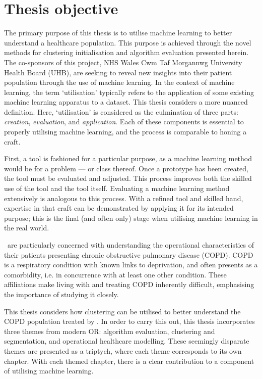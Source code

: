 \section{Thesis objective}\label{sec:objective}

The primary purpose of this thesis is to utilise machine learning to better
understand a healthcare population. This purpose is achieved through the novel
methods for clustering initialisation and algorithm evaluation presented herein.
The co-sponsors of this project, NHS Wales Cwm Taf Morgannwg University
Health Board (UHB), are seeking to reveal new insights into their patient
population through the use of machine learning. In the context of machine
learning, the term `utilisation' typically refers to the application of some
existing machine learning apparatus to a dataset. This thesis considers a more
nuanced definition. Here, `utilisation' is considered as the culmination of
three parts: \emph{creation}, \emph{evaluation}, and \emph{application}. Each of
these components is essential to properly utilising machine learning, and the
process is comparable to honing a craft.

First, a tool is fashioned for a particular purpose, as a machine learning
method would be for a problem --- or class thereof. Once a prototype has been
created, the tool must be evaluated and adjusted. This process improves both the
skilled use of the tool and the tool itself. Evaluating a machine
learning method extensively is analogous to this process. With a refined tool
and skilled hand, expertise in that craft can be demonstrated by applying it for
its intended purpose; this is the final (and often only) stage when utilising
machine learning in the real world.

\ctmuhb\ are particularly concerned with understanding the operational
characteristics of their patients presenting chronic obstructive pulmonary
disease (COPD). COPD is a respiratory condition with known links to deprivation,
and often presents as a comorbidity, i.e. in concurrence with at least one other
condition. These affiliations make living with and treating COPD inherently
difficult, emphasising the importance of studying it closely.

This thesis considers how clustering can be utilised to better understand the
COPD population treated by \ctmuhb. In order to carry this out, this
thesis incorporates three themes from modern OR: algorithm evaluation,
clustering and segmentation, and operational healthcare modelling. These
seemingly disparate themes are presented as a triptych, where each theme
corresponds to its own chapter. With each themed chapter, there is a clear
contribution to a component of utilising machine learning.

